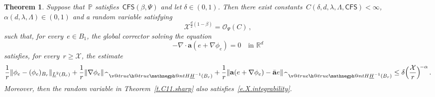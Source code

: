 \documentclass[11pt]{article} %
\makeatletter
\numberwithin{equation}{section}
\newtheorem{theorem}{Theorem}[section]
\theoremstyle{definition}
\newcommand*{\R}{\ensuremath{\mathbb{R}}}
\renewcommand*{\hat}{\widehat}
\newcommand{\qand}{\quad \mbox{and} \quad }
\newcommand{\f}{\mathbf{f}}
\renewcommand{\a}{\mathbf{a}}
\newcommand{\ahom}{\bar{\a}}
\renewcommand{\P}{\mathbb{P}}
\newcommand{\X}{\mathcal{X}}
\renewcommand{\O}{\mathcal{O}}
\newcommand{\negphantom}{\v@true\h@true\negph@nt}
\newcommand{\negph@nt}{\ifmmode\expandafter\mathpalette 
  \expandafter\mathnegph@nt\else\expandafter\makenegph@nt\fi}
\newcommand{\makenegph@nt}[1]{%
  \setbox\z@\hbox{\color@begingroup#1\color@endgroup}\finnegph@nt}
\newcommand{\finnegph@nt}{%
  \setbox\tw@\null 
  \ifv@ \ht\tw@\ht\z@\dp\tw@\dp\z@\fi \ifh@\wd\tw@-\wd\z@\fi\box\tw@}
\newcommand{\mathnegph@nt}[2]{%
  \setbox\z@\hbox{$\m@th #1{#2}$}\finnegph@nt}
\newcommand{\Hminusul}{\hat{\phantom{H}}\negphantom{H}\underline{H}^{-1}}
\newcommand{\CFS}{\mathsf{CFS}}
\makeatother
\begin{document}
\begin{theorem}
\label{t.optimalstochasticintegrability}
Suppose that~$\P$ satisfies~$\CFS(\beta,\Psi)$ and let $\delta\in(0,1)$. Then there exist constants~$C(\delta,d,\lambda,\Lambda,\CFS)<\infty$,~$\alpha(d,\lambda,\Lambda) \in (0,1)$  and a random variable satisfying   
\begin{equation} \label{e.X.integrability}
\X^{\frac d2(1-\beta)} = \O_\Psi(C)\,,
\end{equation}
such that, for every~$e \in B_1$, the global corrector solving the equation
\begin{equation*}  
- \nabla \cdot \a (e + \nabla \phi_e) = 0 \quad \mbox{in } \R^d
\end{equation*}
satisfies, for every~$r \geq \X$, the estimate
\begin{equation} \label{e.optimalstochasticintegrability}
\frac1r \|\phi_e - (\phi_e)_{B_r} \|_{\underline{L}^2(B_r)}
+
\frac1r \|\nabla \phi_e \|_{\Hminusul(B_r)} 
+ 
\frac1r \|\a(e + \nabla \phi_e) - \ahom e \|_{\Hminusul(B_r)} 
\leq 
\delta \Bigl(\frac{\X}{r} \Bigr)^{\!-\alpha} \,.
\end{equation}
Moreover, then the random variable in Theorem~\ref{t.C11.sharp} also satisfies~\eqref{e.X.integrability}. 
\end{theorem}
\end{document}
